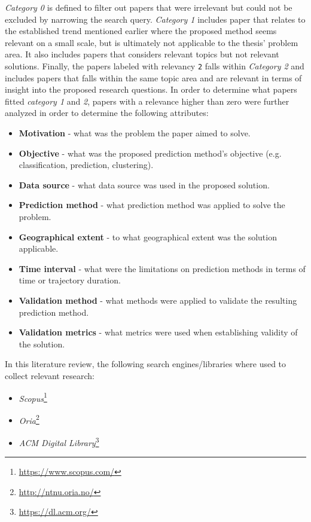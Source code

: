 \textit{Category 0} is defined to filter out papers that were irrelevant but could not be excluded by narrowing the search query. \textit{Category 1} includes paper that relates to the established trend mentioned earlier where the proposed method seems relevant on a small scale, but is ultimately not applicable to the thesis' problem area. It also includes papers that considers relevant topics but not relevant solutions. Finally, the papers labeled with relevancy \texttt{2} falls within \textit{Category 2} and includes papers that falls within the same topic area and are relevant in terms of insight into the proposed research questions. In order to determine what papers fitted \textit{category 1} and \textit{2}, papers with a relevance higher than zero were further analyzed in order to determine the following attributes:

\begin{itemize}
    \item \textbf{Motivation} - what was the problem the paper aimed to solve.
    \item \textbf{Objective} - what was the proposed prediction method's objective (e.g. classification, prediction, clustering).
    \item \textbf{Data source} - what data source was used in the proposed solution.
    \item \textbf{Prediction method} - what prediction method was applied to solve the problem.
    \item \textbf{Geographical extent} - to what geographical extent was the solution applicable.
    \item \textbf{Time interval} - what were the limitations on prediction methods in terms of time or trajectory duration.
    \item \textbf{Validation method} - what methods were applied to validate the resulting prediction method.
    \item \textbf{Validation metrics} - what metrics were used when establishing validity of the solution.
\end{itemize}

In this literature review, the following search engines/libraries where used to collect relevant research:

\begin{itemize}
    \item \textit{Scopus}\footnote{\url{https://www.scopus.com/}}
    \item \textit{Oria}\footnote{\url{http://ntnu.oria.no/}}
    \item \textit{ACM Digital Library}\footnote{\url{https://dl.acm.org/}}
\end{itemize}

